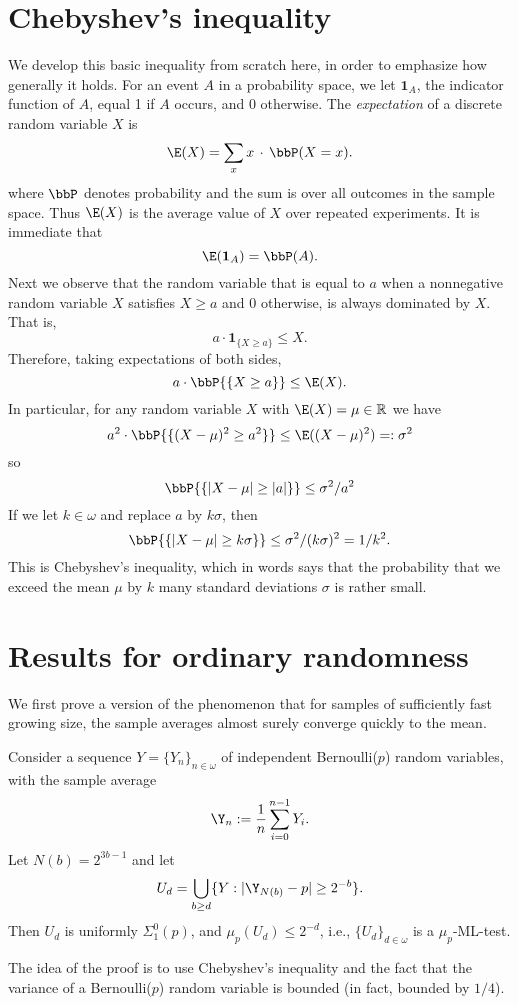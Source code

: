 \section{Chebyshev's inequality}

We develop this basic inequality from scratch here, in order to emphasize how generally it holds. For an event $A$ in a probability space, we let $\mathbf 1_A$, the indicator function of $A$, equal 1 if $A$ occurs, and $0$ otherwise. The \emph{expectation} of a discrete random variable $X$ is 
\[
\E(X)=\sum_x x\,\cdot\,\bbP(X=x).
\]
where $\bbP$ denotes probability and the sum is over all outcomes in the sample space. Thus $\E(X)$ is the average value of $X$ over repeated experiments. It is immediate that
\[
\E (\mathbf 1_{A}) = \bbP(A).
\]
Next we observe that the random variable that is equal to $a$ when a nonnegative random variable $X$ satisfies $X\ge a$ and $0$ otherwise, is always dominated by $X$. That is, 
\[
a\cdot \mathbf 1_{\{X\ge a\}} \le X.
\]
Therefore, taking expectations of both sides,
\[
a\cdot \bbP{\{X\ge a\}} \le \E(X).
\]
In particular, for any random variable $X$ with $\E(X)=\mu\in\mathbb R$ we have 
\[
a^2\cdot \bbP{\{(X-\mu)^2\ge a^2\}} \le \E ((X-\mu)^2)=:\sigma^2
\]
so
\[
\bbP{\{|X-\mu|\ge |a|\}} \le \sigma^2/a^2
\]
If we let $k\in\omega$ and replace $a$ by $k\sigma$, then
\[
\bbP{\{|X-\mu|\ge k\sigma\}} \le \sigma^2/(k\sigma)^2 = 1/k^2.
\]
This is Chebyshev's inequality, which in words says that the probability that we exceed the mean $\mu$ by $k$ many standard deviations $\sigma$ is rather small.

\section{Results for ordinary randomness}

We first prove a version of the phenomenon that for samples of sufficiently fast growing size, the sample averages almost surely converge quickly to the mean.
					
\begin{proposition}\label{one}
Consider a sequence $Y=\{Y_n\}_{n\in\omega}$ of independent Bernoulli($p$) random variables, with the sample average 
\[
\Y_n := \frac{1}{n}\sum_{i=0}^{n-1} Y_i.
\]
Let $N(b)=2^{3b-1}$ and let 
\[
U_d=\bigcup_{b\ge d}\{Y: |\Y_{N(b)}-p|\ge 2^{-b}\}.
\]
Then $U_d$ is uniformly $\Sigma^0_1(p)$, and $\mu_p(U_d)\le 2^{-d}$, i.e., $\{U_d\}_{d\in\omega}$ is a $\mu_p$-ML-test.
\end{proposition} 
The idea of the proof is to use Chebyshev's inequality and the fact that the variance of a Bernoulli($p$) random variable is bounded (in fact, bounded by $1/4$).


